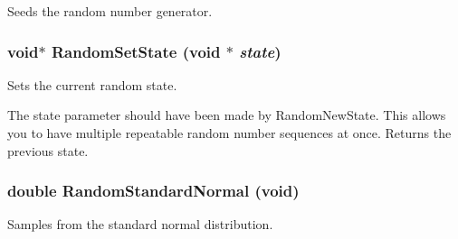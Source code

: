 Seeds the random number generator. 

\subsubsection{\setlength{\rightskip}{0pt plus 5cm}void$\ast$ Random\-Set\-State (void $\ast$ {\em state})}\label{random_8h_a8}


Sets the current random state. 

The state parameter should have been made by Random\-New\-State. This allows you to have multiple repeatable random number sequences at once. Returns the previous state. 
\subsubsection{\setlength{\rightskip}{0pt plus 5cm}double Random\-Standard\-Normal (void)}\label{random_8h_a5}


Samples from the standard normal distribution. 


